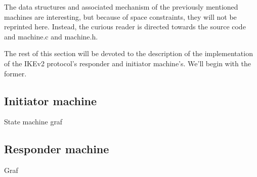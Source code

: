 \documentclass[final,a4paper,twoside,11pt,onecolumn]{report}
\begin{document}
The data structures and associated mechanism of the previously mentioned machines are interesting, but because of space constraints, they will not be reprinted here. Instead, the curious reader is directed towards the source code and machine.c and machine.h.

The rest of this section will be devoted to the description of the implementation of the IKEv2 protocol's responder and initiator machine's. We'll begin with the former.

\subsection{Initiator machine}
State machine graf

\subsection{Responder machine}
Graf

\end{document}
